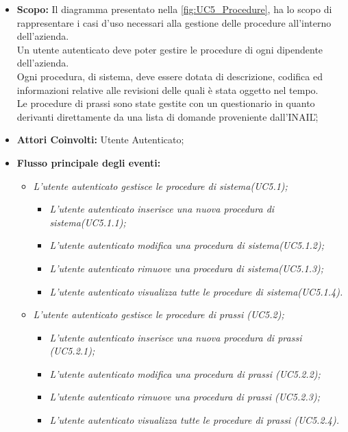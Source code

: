 			\begin{itemize}
				\item \textbf{Scopo:} Il diagramma presentato nella \autoref{fig:UC5_Procedure}, ha lo scopo di rappresentare i casi d'uso necessari alla gestione delle procedure all'interno dell'azienda. \\ 
				
				Un utente autenticato deve poter gestire le procedure di ogni dipendente dell'azienda. \\
				Ogni procedura, di sistema, deve essere dotata di descrizione, codifica ed informazioni relative alle revisioni delle quali è stata oggetto nel tempo.\\
				Le procedure di prassi sono state gestite con un questionario in quanto derivanti direttamente da una lista di domande proveniente dall'\gls{INAIL}\G;
				\item \textbf{Attori Coinvolti:} Utente Autenticato;
				\item \textbf{Flusso principale degli eventi:} 
				\begin{itemize}
					\item \textit{L'utente autenticato gestisce le procedure di sistema(UC5.1);}
					\begin{itemize}
						\item \textit{L'utente autenticato inserisce una nuova procedura di sistema(UC5.1.1);}
						\item \textit{L'utente autenticato modifica una procedura di sistema(UC5.1.2);}
						\item \textit{L'utente autenticato rimuove una procedura di sistema(UC5.1.3);}
						\item \textit{L'utente autenticato visualizza tutte le procedure di sistema(UC5.1.4).}
					\end{itemize}
					\item \textit{L'utente autenticato gestisce le procedure di prassi (UC5.2);}
					\begin{itemize}
						\item \textit{L'utente autenticato inserisce una nuova procedura di prassi (UC5.2.1);}
						\item \textit{L'utente autenticato modifica una procedura di prassi (UC5.2.2);}
						\item \textit{L'utente autenticato rimuove una procedura di prassi (UC5.2.3);}
						\item \textit{L'utente autenticato visualizza tutte le procedure di prassi (UC5.2.4).}
					\end{itemize}
				\end{itemize}
			\end{itemize}
			
